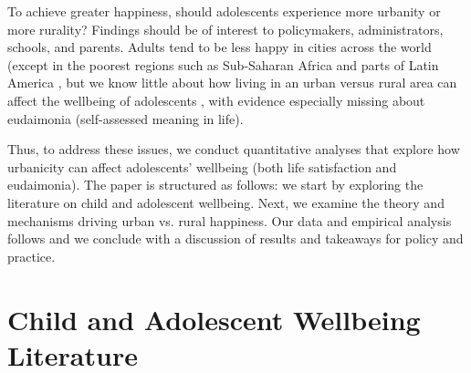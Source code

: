 \documentclass[10pt, letterpaper]{article}
\begin{document}
\begin{spacing}{1.4}
To achieve greater happiness, should adolescents experience more urbanity or more rurality? Findings should be of interest to policymakers, administrators, schools, and 
parents. Adults tend to be less happy in cities across the world
(except in the poorest regions such as Sub-Saharan Africa and parts of Latin
America \citep{aok21,valente2016}, but we know little about how living in an
urban versus rural area can affect the wellbeing of adolescents
\citep{marquez24}, with evidence especially missing about eudaimonia (self-assessed meaning in life).  

Thus, to address these issues,  we conduct quantitative analyses that explore how
urbanicity can affect adolescents'  wellbeing (both life satisfaction and
eudaimonia). The paper is structured as follows: we start by exploring the
literature on child and adolescent wellbeing. Next, we examine the theory and
mechanisms driving urban vs. rural happiness. %
Our data and
empirical analysis follows and we conclude with a discussion of results and
takeaways for policy and practice.


\section*{Child and Adolescent  Wellbeing Literature}




\end{spacing}
\end{document}
